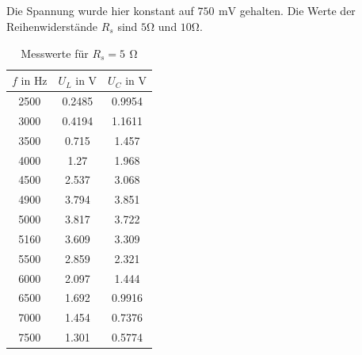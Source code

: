 \documentclass[a4paper, 12pt]{article}
\begin{document}
  \subsection{}
    Die Spannung wurde hier konstant auf $750 \,\ \si{\milli\volt}$ gehalten. Die Werte der Reihenwiderstände $R_s$ sind $5 \si{\ohm}$ und $10 \si{\ohm}$.\\

    \begin{table}[H]
      \begin{center}
        \begin{tabular}{@{}ccc@{}}
        \toprule
          $f \text{ in } \si{\hertz}$   &   $U_L \text{ in } \si{\volt}$     &  $U_C \text{ in } \si{\volt}$      \\ \midrule
        2500 & 0.2485 & 0.9954 \\
        3000 & 0.4194 & 1.1611 \\
        3500 & 0.715  & 1.457  \\
        4000 & 1.27   & 1.968  \\
        4500 & 2.537  & 3.068  \\
        4900 & 3.794  & 3.851  \\
        5000 & 3.817  & 3.722  \\
        5160 & 3.609  & 3.309  \\
        5500 & 2.859  & 2.321  \\
        6000 & 2.097  & 1.444  \\
        6500 & 1.692  & 0.9916 \\
        7000 & 1.454  & 0.7376 \\
        7500 & 1.301  & 0.5774 \\ \bottomrule
        \end{tabular}
      \caption*{Messwerte für $R_s=5 \,\ \si{\ohm}$}
    \end{center}
    \end{table}
\end{document}
